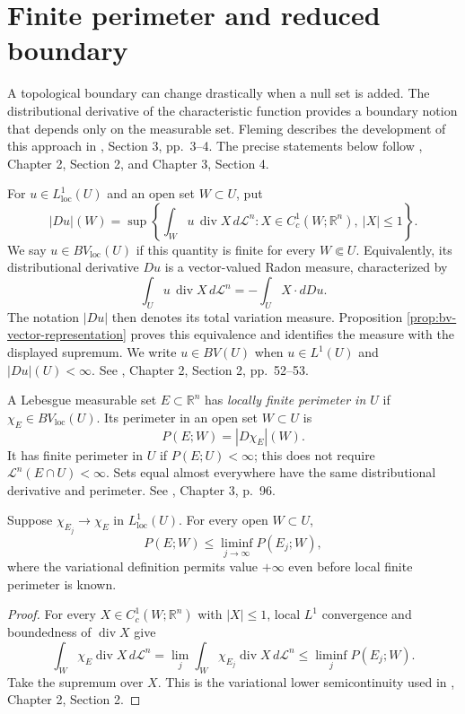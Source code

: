 \chapter{Finite perimeter and reduced boundary}\label{sec:finite-perimeter}
A topological boundary can change drastically when a null set is added. The distributional derivative of the characteristic function provides a boundary notion that depends only on the measurable set. Fleming describes the development of this approach in \cite{Fle16}, Section 3, pp.~3--4. The precise statements below follow \cite{Sim18}, Chapter 2, Section 2, and Chapter 3, Section 4.

\begin{definition}\label{def:bv}
For $u\in L^1_{\mathrm{loc}}(U)$ and an open set $W\subset U$, put
\[
 |Du|(W)=\sup\left\{\int_W u\,\operatorname{div}X\,d\mathcal{L}^n:
 X\in C_c^1(W;\mathbb{R}^n),\ |X|\leq1\right\}.
\]
We say $u\in BV_{\mathrm{loc}}(U)$ if this quantity is finite for every $W\Subset U$. Equivalently, its distributional derivative $Du$ is a vector-valued Radon measure, characterized by
\[
 \int_U u\,\operatorname{div}X\,d\mathcal{L}^n=-\int_U X\cdot dDu.
\]
The notation $|Du|$ then denotes its total variation measure. Proposition \ref{prop:bv-vector-representation} proves this equivalence and identifies the measure with the displayed supremum. We write $u\in BV(U)$ when $u\in L^1(U)$ and $|Du|(U)<\infty$. See \cite{Sim18}, Chapter 2, Section 2, pp.~52--53.
\end{definition}

\begin{definition}\label{def:finite-perimeter}
A Lebesgue measurable set $E\subset\mathbb{R}^n$ has \emph{locally finite perimeter in $U$} if $\chi_E\in BV_{\mathrm{loc}}(U)$. Its perimeter in an open set $W\subset U$ is
\[
 P(E;W)=|D\chi_E|(W).
\]
It has finite perimeter in $U$ if $P(E;U)<\infty$; this does not require $\mathcal{L}^n(E\cap U)<\infty$. Sets equal almost everywhere have the same distributional derivative and perimeter. See \cite{Sim18}, Chapter 3, p.~96.
\end{definition}

\begin{proposition}\label{prop:perimeter-lsc}
Suppose $\chi_{E_j}\to\chi_E$ in $L^1_{\mathrm{loc}}(U)$. For every open $W\subset U$,
\[
 P(E;W)\leq\liminf_{j\to\infty}P(E_j;W),
\]
where the variational definition permits value $+\infty$ even before local finite perimeter is known.
\end{proposition}
\begin{proof}
For every $X\in C_c^1(W;\mathbb{R}^n)$ with $|X|\leq1$, local $L^1$ convergence and boundedness of $\operatorname{div}X$ give
\[
 \int_W\chi_E\operatorname{div}X\,d\mathcal{L}^n
 =\lim_j\int_W\chi_{E_j}\operatorname{div}X\,d\mathcal{L}^n
 \leq\liminf_j P(E_j;W).
\]
Take the supremum over $X$. This is the variational lower semicontinuity used in \cite{Sim18}, Chapter 2, Section 2.
\end{proof}

